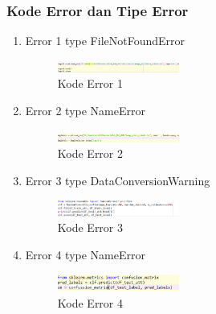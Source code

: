         \subsubsection{Kode Error dan Tipe Error}
            \begin{enumerate}
                \item Error 1 type FileNotFoundError
                \begin{figure}[H]
                    \includegraphics[width=4cm]{figures/1174040/chapter3/err1.png}
                    \centering
                    \caption{Kode Error 1}
                    \end{figure}
                \item Error 2 type NameError
                \begin{figure}[H]
                    \includegraphics[width=4cm]{figures/1174040/chapter3/err2.png}
                    \centering
                    \caption{Kode Error 2}
                    \end{figure}
                \item Error 3 type DataConversionWarning
                \begin{figure}[H]
                    \includegraphics[width=4cm]{figures/1174040/chapter3/err3.png}
                    \centering
                    \caption{Kode Error 3}
                    \end{figure}
                \item Error 4 type NameError
                \begin{figure}[H]
                    \includegraphics[width=4cm]{figures/1174040/chapter3/err4.png}
                    \centering
                    \caption{Kode Error 4}
                    \end{figure}
            \end{enumerate}
